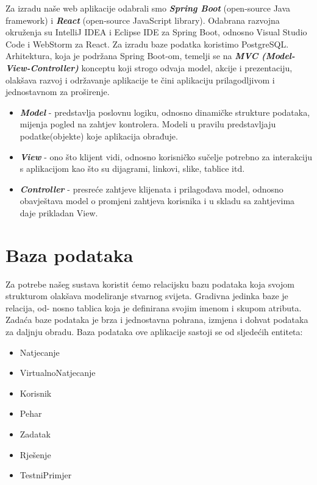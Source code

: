 Za izradu naše web aplikacije odabrali smo \textit{\textbf{Spring Boot}} (open-source Java framework) i \textit{\textbf{React}} (open-source JavaScript library). Odabrana razvojna okruženja su IntelliJ IDEA i Eclipse IDE za Spring Boot, odnosno Visual Studio Code i WebStorm za React. Za izradu baze podatka koristimo PostgreSQL.
Arhitektura, koja je podržana Spring Boot-om, temelji se na \textit{\textbf{MVC (Model-View-Controller)}} konceptu koji strogo odvaja model, akcije i prezentaciju, olakšava razvoj i održavanje aplikacije te čini aplikaciju prilagodljivom i jednostavnom za proširenje.
\begin{itemize}
	\item \textit{\textbf{Model}} - predstavlja poslovnu logiku, odnosno dinamičke strukture podataka, mijenja pogled na zahtjev kontrolera. Modeli u pravilu predstavljaju podatke(objekte) koje aplikacija obrađuje.
	\item \textit{\textbf{View}} - ono što klijent vidi, odnosno korisničko sučelje potrebno za interakciju s aplikacijom kao što su dijagrami, linkovi, slike, tablice itd.
	\item \textit{\textbf{Controller}} - presreće zahtjeve klijenata i prilagođava model, odnosno obavještava model o promjeni zahtjeva korisnika i u skladu sa zahtjevima daje prikladan View.
\end{itemize}

\section{Baza podataka}
			
Za potrebe našeg sustava koristit ćemo relacijsku bazu podataka koja svojom strukturom olakšava modeliranje stvarnog svijeta. Gradivna jedinka baze je relacija, od- nosno tablica koja je definirana svojim imenom i skupom atributa. Zadaća baze podataka je brza i jednostavna pohrana, izmjena i dohvat podataka za daljnju obradu. Baza podataka ove aplikacije sastoji se od sljedećih entiteta:
\begin{itemize}
	\item Natjecanje
	\item VirtualnoNatjecanje
	\item Korisnik
	\item Pehar
	\item Zadatak
	\item Rješenje
	\item TestniPrimjer		
\end{itemize}
				

